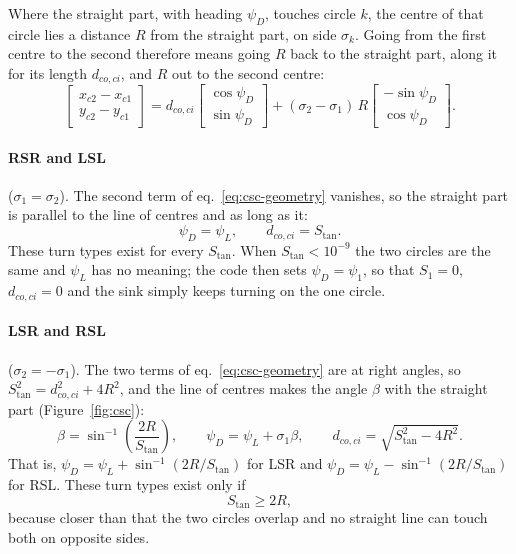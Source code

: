 \documentclass[10pt]{article}
\newcommand{\Stan}{S_{\tan}}
\newcommand{\dcoci}{d_{co,ci}}
\begin{document}
Where the straight part, with heading $\psi_D$, touches circle $k$, the centre of that circle lies a distance $R$
from the straight part, on side $\sigma_k$. Going from the first centre to the second therefore means going $R$ back
to the straight part, along it for its length $\dcoci$, and $R$ out to the second centre:
\begin{equation}
  \begin{bmatrix} x_{c2} - x_{c1} \\ y_{c2} - y_{c1} \end{bmatrix}
  = \dcoci \begin{bmatrix} \cos\psi_D \\ \sin\psi_D \end{bmatrix}
  + (\sigma_2 - \sigma_1)\,R \begin{bmatrix} -\sin\psi_D \\ \cos\psi_D \end{bmatrix}.
  \label{eq:csc-geometry}
\end{equation}

\paragraph{RSR and LSL} ($\sigma_1 = \sigma_2$). The second term of eq.~\eqref{eq:csc-geometry} vanishes, so the
straight part is parallel to the line of centres and as long as it:
\begin{equation}
  \psi_D = \psi_L, \qquad \dcoci = \Stan.
  \label{eq:csc-same}
\end{equation}
These turn types exist for every $\Stan$. When $\Stan < 10^{-9}$ the two circles are the same and $\psi_L$ has no
meaning; the code then sets $\psi_D = \psi_1$, so that $S_1 = 0$, $\dcoci = 0$ and the sink simply keeps turning on
the one circle.

\paragraph{LSR and RSL} ($\sigma_2 = -\sigma_1$). The two terms of eq.~\eqref{eq:csc-geometry} are at right angles,
so $\Stan^2 = \dcoci^2 + 4R^2$, and the line of centres makes the angle $\beta$ with the straight part
(Figure~\ref{fig:csc}):
\begin{equation}
  \beta = \sin^{-1}\!\left(\frac{2R}{\Stan}\right), \qquad
  \psi_D = \psi_L + \sigma_1 \beta, \qquad
  \dcoci = \sqrt{\Stan^2 - 4R^2}.
  \label{eq:csc-cross}
\end{equation}
That is, $\psi_D = \psi_L + \sin^{-1}(2R/\Stan)$ for LSR and $\psi_D = \psi_L - \sin^{-1}(2R/\Stan)$ for RSL. These turn
types exist only if
\begin{equation}
  \Stan \ge 2R,
  \label{eq:csc-exists}
\end{equation}
because closer than that the two circles overlap and no straight line can touch both on opposite sides.
\end{document}
